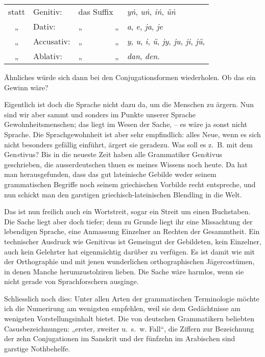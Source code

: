 \begin{table}[h]
\centering
\begin{tabular}{c l l l}
statt & Genitiv: & das Suffix & \textit{yṅ}, \textit{uṅ}, \textit{iṅ}, \textit{üṅ} \\
 „ & Dativ: & „~~~~~~~~„ & \textit{a}, \textit{e}, \textit{ja}, \textit{je} \\
  „ & Accusativ: & „~~~~~~~~„  & \textit{y}, \textit{u}, \textit{i}, \textit{ü}, \textit{jy}, \textit{ju}, \textit{ji}, \textit{jü}, \\
 „ & Ablativ: & „~~~~~~~~„ & \textit{dan}, \textit{den}.
\end{tabular}
\end{table}

\noindent Ähnliches würde sich dann bei den Conjugationsformen wiederholen. Ob das ein Gewinn wäre?

Eigentlich ist doch die Sprache nicht dazu da, um die Menschen zu ärgern. Nun sind wir aber sammt und sonders im Punkte unserer Sprache Gewohnheitsmenschen; das liegt im Wesen der Sache, – es wäre ja sonst nicht  Sprache. Die Sprachgewohnheit ist aber sehr empfindlich: alles Neue, wenn es sich nicht besonders gefällig einführt, ärgert sie geradezu. Was soll es z.~B. mit dem Gen\textit{e}tivus? Bis in die neueste Zeit haben alle Grammatiker Gen\textit{i}tivus geschrieben, die ausserdeutschen thuen es meines Wissens noch heute. Da hat man herausgefunden, dass das gut lateinische Gebilde weder seinem grammatischen Begriffe noch seinem griechischen Vorbilde recht entspreche, und nun schickt man den garstigen griechisch-lateinischen Blendling in die Welt.

\label{fp.122}

Das ist nun freilich auch ein Wortstreit, sogar ein Streit um einen Buchstaben. Die Sache liegt aber doch tiefer; denn zu Grunde liegt ihr eine Missachtung der lebendigen Sprache, eine Anmassung Einzelner an Rechten der \label{sp.116} Gesammtheit. Ein technischer Ausdruck wie Genitivus ist Gemeingut der Gebildeten, kein Einzelner, auch kein Gelehrter hat eigenmächtig darüber zu verfügen. Es ist damit wie mit der Orthographie und mit jenen wunderlichen orthographischen Jägercostümen, in denen Manche herumzustolziren lieben. Die Sache wäre harmlos, wenn sie nicht gerade von Sprachforschern ausginge.

Schliesslich noch dies: Unter allen Arten der grammatischen Terminologie möchte ich die Numerirung am wenigsten empfehlen, weil sie dem Gedächtnisse am wenigsten Vorstellungsinhalt bietet. Die von deutschen Grammatikern beliebten Casusbezeichnungen: „erster, zweiter u.~s.~w. Fall“, die Ziffern zur Bezeichnung der zehn Conjugationen im Sanskrit und der fünfzehn im Arabischen sind garstige Nothbehelfe.

